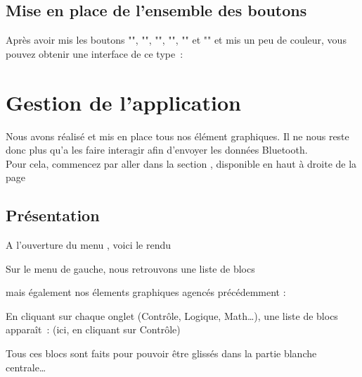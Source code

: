 
\section{Mise en place de l'ensemble des boutons}

Après avoir mis les boutons "", "", "", "", "" et "" et mis un peu de couleur, vous pouvez obtenir une interface de ce type :


\chapter{Gestion de l'application}

Nous avons réalisé et mis en place tous nos élément graphiques. Il ne nous reste donc plus qu'a les faire interagir afin d'envoyer les données Bluetooth. \\
\noindent
Pour cela, commencez par aller dans la section , disponible en haut à droite de la page


\newpage
\section{Présentation}
A l'ouverture du menu , voici le rendu

Sur le menu de gauche, nous retrouvons une liste de blocs 

 \label{place_menu_left}

mais également nos élements graphiques agencés précédemment : 


En cliquant sur chaque onglet (Contrôle, Logique, Math…), une liste de blocs apparaît :
(ici, en cliquant sur Contrôle)


Tous ces blocs sont faits pour pouvoir être glissés dans la partie blanche centrale…



